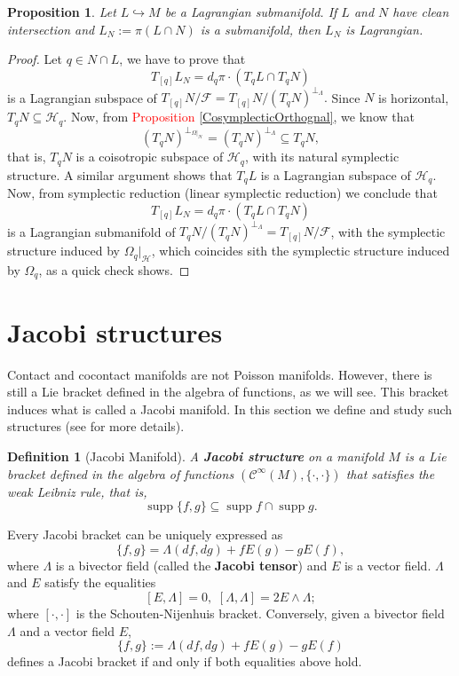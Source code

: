\documentclass[12pt]{article}
\newtheorem{prop}{Proposition}[section]
\newtheorem{Def}{Definition}[section]
\newcommand{\supp}{\operatorname{supp}}
\newcommand{\sectiontitle}{section}
\newcommand{\setsectiontitle}[1]{\renewcommand{\sectiontitle}{\footnotesize\textit{#1}}}
\renewcommand{\supp}{\operatorname{supp}}
\begin{document}
\begin{prop} Let $L \hookrightarrow M$ be a Lagrangian submanifold. If $L$ and $N$ have clean intersection and $L_N:= \pi(L\cap N)$ is a submanifold, then $L_N$ is Lagrangian.
\end{prop}
\begin{proof} Let $q \in N \cap L$, we have to prove that $$T_{[q]} L_N = d_q\pi  \cdot \left( T_q L \cap T_q N\right)$$ is a Lagrangian subspace of $T_{[q]} N/\mathcal{F} = T_{[q]}N / \left( T_{q} N\right)^{\perp_{\Lambda}}.$ Since $N$ is horizontal, $T_q N \subseteq \mathcal{H}_q$. Now, from \textcolor{red}{Proposition \ref{CosymplecticOrthognal}}, we know that $$(T_qN) ^{\perp_{\Omega|_{\mathcal{H}}}} = (T_q N)^{\perp_\Lambda} \subseteq T_qN,$$ that is, $T_qN$ is a coisotropic subspace of $\mathcal{H}_q$, with its natural symplectic structure. A similar argument shows that $T_qL$ is a Lagrangian subspace of $\mathcal{H}_q.$ Now, from symplectic reduction (linear symplectic reduction) we conclude that $$ T_{[q]} L_N = d_q\pi  \cdot \left( T_q L \cap T_q N\right)$$ is a Lagrangian submanifold of $T_qN/\left( T_{q} N\right)^{\perp_{\Lambda}} = T_{[q]} N/ \mathcal{F}$, with the symplectic structure induced by $\Omega_q|_{\mathcal{H}}$, which coincides sith the symplectic structure induced by $\Omega_q$, as a quick check shows.
\end{proof}

\section{Jacobi structures} \label{Jacobi}
\setsectiontitle{JACOBI STRUCTURES}
Contact and cocontact manifolds are not Poisson manifolds. However, there is still a Lie bracket defined in the algebra of functions, as we will see. This bracket induces what is called a Jacobi manifold. In this section we define and study such structures (see \cites{libermann2012symplectic, raul} for more details).\\

\begin{Def}[Jacobi Manifold] A \textbf{Jacobi structure} on a manifold $M$ is a Lie bracket defined in the algebra of functions $(\mathcal{C}^\infty(M), \{ \cdot, \cdot \})$ that satisfies the weak Leibniz rule, that is, $$\supp\{f,g\} \subseteq \supp f \cap \supp g.$$
\end{Def}

Every Jacobi bracket can be uniquely expressed as $$\{f,g\} = \Lambda(df, dg) + f E(g) - gE(f),$$ where $\Lambda$ is a bivector field (called the \textbf{Jacobi tensor}) and $E$ is a vector field. $\Lambda$ and $E$ satisfy the equalities $$[E, \Lambda] = 0, \,\, [\Lambda, \Lambda] = 2E \wedge \Lambda;$$ where $[\cdot, \cdot]$ is the Schouten-Nijenhuis bracket. Conversely, given a bivector field $\Lambda$ and a vector field $E$, $$\{f,g\} := \Lambda(df, dg) + f  E(g) - g E(f)$$ defines a Jacobi bracket if and only if both equalities above hold.\\
\end{document}
